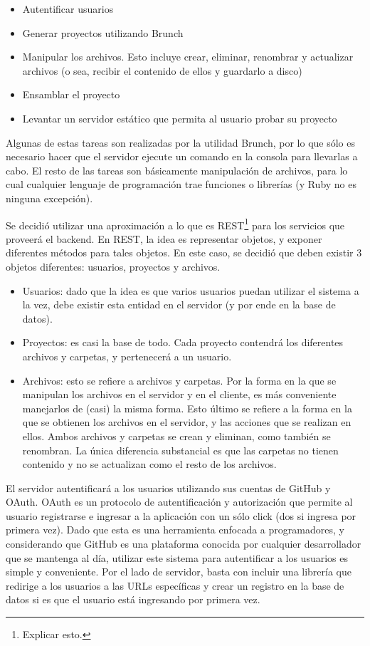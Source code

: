 \documentclass[12pt,titlepage,]{article}
\begin{document}
\begin{itemize}
\item
  Autentificar usuarios
\item
  Generar proyectos utilizando Brunch
\item
  Manipular los archivos. Esto incluye crear, eliminar, renombrar y
  actualizar archivos (o sea, recibir el contenido de ellos y guardarlo
  a disco)
\item
  Ensamblar el proyecto
\item
  Levantar un servidor estático que permita al usuario probar su
  proyecto
\end{itemize}

Algunas de estas tareas son realizadas por la utilidad Brunch, por lo
que sólo es necesario hacer que el servidor ejecute un comando en la
consola para llevarlas a cabo. El resto de las tareas son básicamente
manipulación de archivos, para lo cual cualquier lenguaje de
programación trae funciones o librerías (y Ruby no es ninguna
excepción).

Se decidió utilizar una aproximación a lo que es REST\footnote{Explicar
  esto.} para los servicios que proveerá el backend. En REST, la idea es
representar objetos, y exponer diferentes métodos para tales objetos. En
este caso, se decidió que deben existir 3 objetos diferentes: usuarios,
proyectos y archivos.

\begin{itemize}
\item
  Usuarios: dado que la idea es que varios usuarios puedan utilizar el
  sistema a la vez, debe existir esta entidad en el servidor (y por ende
  en la base de datos).
\item
  Proyectos: es casi la base de todo. Cada proyecto contendrá los
  diferentes archivos y carpetas, y pertenecerá a un usuario.
\item
  Archivos: esto se refiere a archivos y carpetas. Por la forma en la
  que se manipulan los archivos en el servidor y en el cliente, es más
  conveniente manejarlos de (casi) la misma forma. Esto último se
  refiere a la forma en la que se obtienen los archivos en el servidor,
  y las acciones que se realizan en ellos. Ambos archivos y carpetas se
  crean y eliminan, como también se renombran. La única diferencia
  substancial es que las carpetas no tienen contenido y no se actualizan
  como el resto de los archivos.
\end{itemize}

El servidor autentificará a los usuarios utilizando sus cuentas de
GitHub y OAuth. OAuth es un protocolo de autentificación y autorización
que permite al usuario registrarse e ingresar a la aplicación con un
sólo click (dos si ingresa por primera vez). Dado que esta es una
herramienta enfocada a programadores, y considerando que GitHub es una
plataforma conocida por cualquier desarrollador que se mantenga al día,
utilizar este sistema para autentificar a los usuarios es simple y
conveniente. Por el lado de servidor, basta con incluir una librería que
redirige a los usuarios a las URLs específicas y crear un registro en la
base de datos si es que el usuario está ingresando por primera vez.
\end{document}
